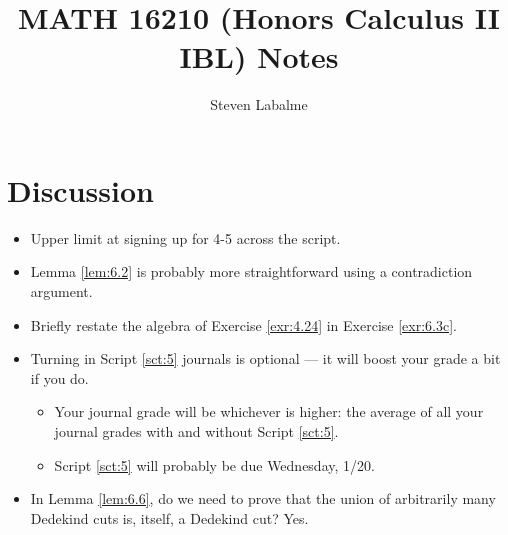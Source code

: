 \documentclass{report}
\title{MATH 16210 (Honors Calculus II IBL) Notes}
\author{Steven Labalme}
\begin{document}
\maketitle



\tableofcontents
\newpage



\pagestyle{main}
\renewcommand{\chaptermark}[1]{\markboth{\chaptername\ \thechapter}{}}
\setcounter{chapter}{5}



\section{Discussion}
\begin{itemize}
    \item {}Upper limit at signing up for 4-5 across the script.
    \item Lemma \ref{lem:6.2} is probably more straightforward using a contradiction argument.
    \item Briefly restate the algebra of Exercise \ref{exr:4.24} in Exercise \ref{exr:6.3c}.
    \item {}Turning in Script \ref{sct:5} journals is optional --- it will boost your grade a bit if you do.
    \begin{itemize}
        \item Your journal grade will be whichever is higher: the average of all your journal grades with and without Script \ref{sct:5}.
        \item Script \ref{sct:5} will probably be due Wednesday, 1/20.
    \end{itemize}
    \item In Lemma \ref{lem:6.6}, do we need to prove that the union of arbitrarily many Dedekind cuts is, itself, a Dedekind cut? Yes.
\end{itemize}
\end{document}
